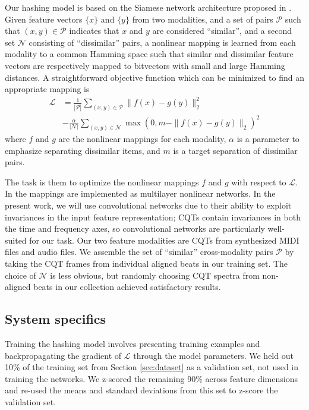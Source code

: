 \documentclass{article}
\begin{document}
Our hashing model is based on the Siamese network architecture proposed in \cite{masci2014multimodal}.
Given feature vectors $\{x\}$ and $\{y\}$ from two modalities, and a set of pairs $\mathcal{P}$ such that $(x, y) \in \mathcal{P}$ indicates that $x$ and $y$ are considered ``similar'', and a second set $\mathcal{N}$ consisting of ``dissimilar'' pairs, a nonlinear mapping is learned from each modality to a common Hamming space such that similar and dissimilar feature vectors are respectively mapped to bitvectors with small and large Hamming distances.
A straightforward objective function which can be minimized to find an appropriate mapping is
\begin{align*}
\mathcal{L} &= \frac{1}{|\mathcal{P}|} \sum_{(x, y) \in \mathcal{P}} \| f(x) - g(y) \|_2^2\\
& - \frac{\alpha}{|\mathcal{N}|} \sum_{(x, y) \in \mathcal{N}} \max(0, m - \|f(x) - g(y) \|_2)^2
\end{align*}
where $f$ and $g$ are the nonlinear mappings for each modality, $\alpha$ is a parameter to emphasize separating dissimilar items, and $m$ is a target separation of dissimilar pairs.

The task is them to optimize the nonlinear mappings $f$ and $g$ with respect to $\mathcal{L}$. 
In \cite{masci2014multimodal} the mappings are implemented as multilayer nonlinear networks.
In the present work, we will use convolutional networks due to their ability to exploit invariances in the input feature representation; CQTs contain invariances in both the time and frequency axes, so convolutional networks are particularly well-suited for our task.
Our two feature modalities are CQTs from synthesized MIDI files and audio files.
We assemble the set of ``similar'' cross-modality pairs $\mathcal{P}$ by taking the CQT frames from individual aligned beats in our training set.
The choice of $\mathcal{N}$ is less obvious, but randomly choosing CQT spectra from non-aligned beats in our collection achieved satisfactory results.

\subsection{System specifics}

Training the hashing model involves presenting training examples and backpropagating the gradient of $\mathcal{L}$ through the model parameters.
We held out 10\% of the training set from Section \ref{sec:dataset} as a validation set, not used in training the networks.
We z-scored the remaining 90\% across feature dimensions and re-used the means and standard deviations from this set to z-score the validation set.
\end{document}
